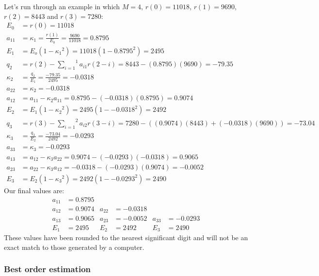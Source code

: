 Let's run through an example in which $M = 4$, $r(0) = 11018$, $r(1) = 9690$,
$r(2) = 8443$ and $r(3) = 7280$:
{
\begin{align}
E_0 &= r(0) = 11018 \\
a_{11} &= \kappa_1 = \frac{r(1)}{E_0} = \frac{9690}{11018} = 0.8795 \\
E_1 &= E_o(1 - {\kappa_1} ^ 2) = 11018(1 - 0.8795 ^ 2) = 2495 \\
q_2 &= r(2) - \overset{1}{\underset{i = 1}{\sum}} a_{i1}r(2 - i) = 8443 - (0.8795)(9690) = -79.35 \\
\kappa_2 &= \frac{q_2}{E_1} = \frac{-79.35}{2495} = -0.0318 \\
a_{22} &= \kappa_2 = -0.0318 \\
a_{12} &= a_{11} - \kappa_2 a_{11} = 0.8795 - (-0.0318)(0.8795) = 0.9074 \\
E_2 &= E_1 (1 - {\kappa_2} ^ 2 ) = 2495(1 - {-0.0318 ^ 2}) = 2492 \\
q_3 &= r(3) - \overset{2}{\underset{i = 1}{\sum}} a_{i2} r(3 - i) = 7280 - ((0.9074)(8443) + (-0.0318)(9690)) = -73.04 \\
\kappa_3 &= \frac{q_3}{E_2} = \frac{-73.04}{2492} = -0.0293 \\
a_{33} &= \kappa_3 = -0.0293 \\
a_{13} &= a_{12} - \kappa_3 a_{22} = 0.9074 - (-0.0293)(-0.0318) = 0.9065 \\
a_{23} &= a_{22} - \kappa_3 a_{12} = -0.0318 - (-0.0293)(0.9074) = -0.0052 \\
E_3 &= E_2 (1 - {\kappa_3} ^ 2 ) = 2492(1 - {-0.0293 ^ 2}) = 2490
\end{align}
}
Our final values are:
{
\begin{align}
a_{11} &= 0.8795 & & & & \\
a_{12} &= 0.9074 & a_{22} &= -0.0318 & & \\
a_{13} &= 0.9065 & a_{23} &= -0.0052 & a_{33} &= -0.0293 \\
E_1 &= 2495 & E_2 &= 2492 & E_3 &= 2490
\end{align}
}
\noindent
These values have been rounded to the nearest significant digit
and will not be an exact match to those generated by a computer.

\subsubsection{Best order estimation}


